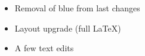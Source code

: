 
\newtitle{\changelog}


\begin{itemize}
\item Removal of blue from last changes
\item Layout upgrade (full \LaTeX{})
\item A few text edits
\end{itemize}
